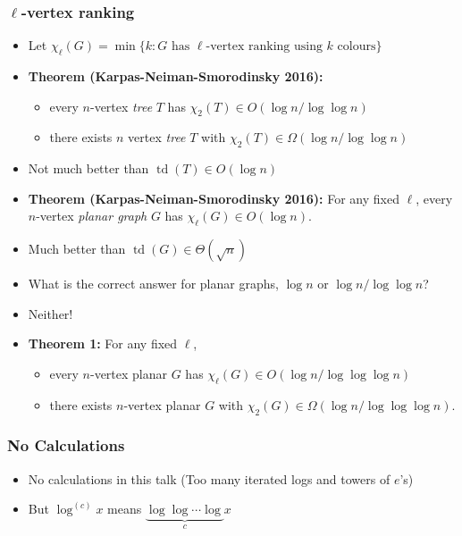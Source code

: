 \documentclass[xcolor=dvipsnames]{beamer}
\DeclareMathOperator{\td}{td}
\begin{document}
\begin{frame}
  \frametitle{$\ell$-vertex ranking}

  \begin{itemize}[<+->]
    \item Let $\chi_\ell(G)=\min\{k:\mbox{$G$ has $\ell$-vertex ranking using $k$ colours}\}$

    \item[]\textbf{Theorem (Karpas-Neiman-Smorodinsky 2016):}
    \begin{itemize}
      \item every $n$-vertex \emph{tree} $T$ has $\chi_2(T)\in O(\log n/\log\log n)$
      \item there exists $n$ vertex \emph{tree} $T$ with $\chi_2(T)\in\Omega(\log n/\log\log n)$
    \end{itemize}

    \item Not much better than $\td(T)\in O(\log n)$\vspace{.5cm}

    \item[]\textbf{Theorem (Karpas-Neiman-Smorodinsky 2016):} For any fixed $\ell$, every $n$-vertex \emph{planar graph} $G$ has $\chi_\ell(G)\in O(\log n)$.

    \item Much better than $\td(G)\in\Theta(\sqrt{n})$\vspace{.5cm}

    \item What is the correct answer for planar graphs, \newline $\log n$ or $\log n/\log\log n$?

    \item Neither!

    \item[]\textbf{Theorem 1: } For any fixed $\ell$,
    \begin{itemize}[<10->]
      \item every $n$-vertex planar $G$ has $\chi_\ell(G)\in O(\log n/\log\log\log n)$
      \item there exists $n$-vertex planar $G$ with $\chi_2(G)\in\Omega(\log n/\log\log\log n)$.
    \end{itemize}
  \end{itemize}
\end{frame}

\begin{frame}
  \frametitle{No Calculations}

  \begin{itemize}[<+->]
    \item No calculations in this talk\newline
    (Too many iterated logs and towers of $e$'s)
    \item But $\log^{(c)} x$ means $\underbrace{\log\log\cdots\log}_c x$
  \end{itemize}

\end{frame}
\end{document}
